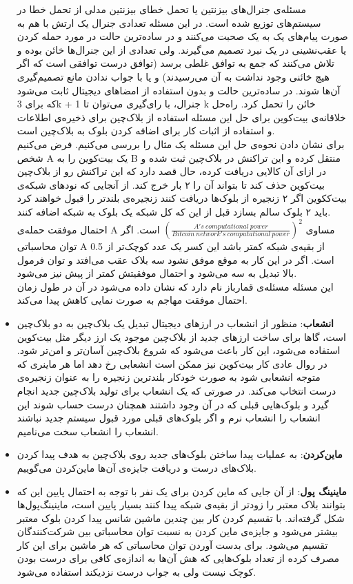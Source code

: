 \begin{itemize}
	مسئله‌ی جنرال‌های بیزنتین یا تحمل خطای بیزنتین مدلی از تحمل خطا در سیستم‌های توزیع شده است. در این مسئله تعدادی جنرال یک ارتش با هم به صورت پیام‌های یک به یک صحبت می‌کنند و در ساده‌ترین حالت در مورد حمله کردن یا عقب‌نشینی در یک نبرد تصمیم می‌گیرند. ولی تعدادی از این جنرال‌ها خائن بوده و تلاش می‌کنند که جمع به توافق غلطی برسد (توافق درست توافقی است که اگر هیچ خائنی وجود نداشت به آن می‌رسیدند) و یا با جواب ندادن مانع تصمیم‌گیری آن‌ها شوند. در ساده‌ترین حالت و بدون استفاده از امضا‌های دیجیتال ثابت می‌شود که برای 3k + 1 جنرال، با رای‌گیری می‌توان تا k خائن را تحمل کرد. 
	راه‌حل خلاقانه‌ی بیت‌کوین برای حل این مسئله استفاده از بلاک‌چین برای ذخیره‌ی اطلاعات و استفاده از اثبات کار برای اضافه کردن بلوک به بلاک‌چین است. 
	\\
	برای نشان دادن نحوه‌ی حل این مسئله‌ یک مثال را بررسی می‌کنیم. فرض می‌کنیم شخص A یک بیت‌کوین را به B منتقل کرده و این تراکنش در بلاک‌چین ثبت شده و در ازای آن کالایی دریافت کرده، حال قصد دارد که این تراکنش رو از بلاک‌چین بیت‌کوین حذف کند تا بتواند آن را ۲ بار خرج کند. از آنجایی که نود‌های شبکه‌ی بیت‌ککوین اگر ۲ زنجیره از بلوک‌ها دریافت کنند زنجیره‌ی بلند‌تر را قبول خواهند کرد باید ۲ بلوک سالم بسازد قبل از این که کل شبکه یک بلوک به شبکه اضافه کنند. 
	\\
	احتمال موفقت حمله‌ی A مساوی
	$(\frac{A's\ computational\ power}{Bitcoin\ network's\ computational\ power}) ^ 2 $
	است. اگر توان محاسباتی A از بقیه‌ی شبکه کمتر باشد این کسر یک عدد کوچک‌تر از 0.5 است. اگر در این کار به موقع موفق نشود سه بلاک عقب می‌افتد و توان فرمول بالا تبدیل به سه می‌شود و احتمال موفقیتش کمتر از پیش نیز می‌شود. 
	\\
	این مسئله مسئله‌ی قمارباز نام دارد که نشان داده می‌شود در آن در طول زمان احتمال موفقت مهاجم به صورت نمایی کاهش پیدا می‌کند.
	
	\item 
	\textbf{انشعاب}:
	منظور از انشعاب در ارز‌های دیجیتال تبدیل یک بلاک‌چین به دو بلاک‌چین است، گاها برای ساخت ارز‌های جدید از بلاک‌چین موجود یک ارز دیگر مثل بیت‌کوین استفاده‌ می‌شود، این کار باعث می‌شود که شروع بلاک‌چین آسان‌تر و امن‌تر شود. در روال عادی کار بیت‌کوین نیز ممکن است انشعابی رخ دهد اما هر ماینری که متوجه انشعابی شود به صورت خود‌کار بلند‌ترین زنجیره را به عنوان زنجیره‌ی درست انتخاب می‌کند. در صورتی که یک انشعاب برای تولید بلاک‌چین جدید انجام گیرد و بلوک‌هایی قبلی که در آن وجود داشتند همچنان درست حساب شوند این انشعاب را انشعاب نرم و اگر بلوک‌های قبلی مورد قبول سیستم‌ جدید نباشند انشعاب را انشعاب سخت می‌نامیم.
	\item 
	\textbf{ماین‌کردن}: 
	به عملیات پیدا ساختن بلوک‌های جدید روی بلاک‌چین به هدف پیدا کردن بلاک‌های درست و دریافت جایزه‌ی آن‌ها ماین‌کردن می‌گوییم.
	\item 
	\textbf{ماینینگ‌ پول}:
	از آن‌ جایی که ماین کردن برای یک نفر با توجه به احتمال پایین این که بتوانند بلاک معتبر را زودتر از بقیه‌ی شبکه پیدا کنند بسیار پایین است، ماینینگ‌پول‌ها شکل گرفته‌اند. با تقسیم کردن کار بین چندین ماشین شانس پیدا کردن بلوک معتبر بیشتر می‌شود و جایزه‌ی ماین‌ کردن به نسبت توان محاسباتی بین شرکت‌کنندگان تقسیم می‌شود. برای بدست آوردن توان محاسباتی که هر ماشین برای این کار مصرف کرده از تعداد بلوک‌هایی که هش آن‌ها به اندازه‌ی کافی برای درست بودن کوچک نیست ولی به جواب درست نزدیکند استفاده می‌شود.
	

\end{itemize}
